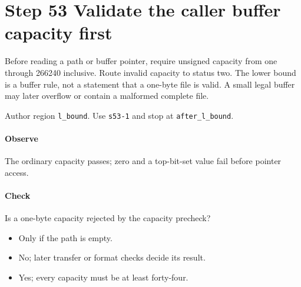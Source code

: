\section{Step 53 Validate the caller buffer capacity first}\label{pcm-wav-s53}
Before reading a path or buffer pointer, require unsigned capacity from one through 266240 inclusive. Route invalid capacity to status two. The lower bound is a buffer rule, not a statement that a one-byte file is valid. A small legal buffer may later overflow or contain a malformed complete file.

Author region \texttt{l\_bound}. Use \texttt{s53-1} and stop at \texttt{after\_l\_bound}.

\paragraph{Observe} The ordinary capacity passes; zero and a top-bit-set value fail before pointer access.

\paragraph{Check} Is a one-byte capacity rejected by the capacity precheck?
\begin{itemize}
  \item[A.] Only if the path is empty.
  \item[B.] No; later transfer or format checks decide its result.
  \item[C.] Yes; every capacity must be at least forty-four.
\end{itemize}
